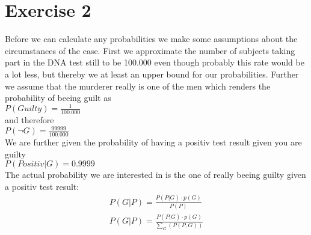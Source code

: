 \def \TutorialSheetNumber{3}


\section*{Exercise 2}
Before we can calculate any probabilities we make some assumptions about the circumstances of the case. First we approximate the number of subjects taking part in the DNA test still to be 100.000 even though probably this rate would be a lot less, but thereby we at least an upper bound for our probabilities. Further we assume that the murderer really is one of the men which renders the probability of beeing guilt as \\ 
$P(Guilty) = \frac{1}{100.000}$\\
and therefore\\
$P(\neg G) = \frac{99999}{100.000}$\\
We are further given the probability of having a positiv test result given you are guilty \\
$P(Positiv|G) = 0.9999 $ \\
The actual probability we are interested in is the one of really beeing guilty given a positiv test result: \\
\begin{align*}
  P(G | P) = \frac{P(P|G) \cdot p(G)}{P(P)} \\
  P(G | P) = \frac{P(P|G) \cdot p(G)}{\sum_{G}(P(P,G))}
\end{align*}
 


